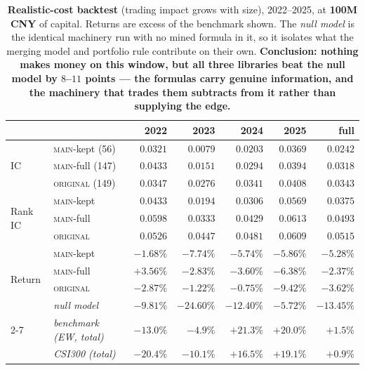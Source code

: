 \documentclass[11pt]{article}
\newcommand{\main}{\textsc{main}}
\newcommand{\orig}{\textsc{original}}
\begin{document}
\begin{table}[h]
\centering\small
\setlength{\tabcolsep}{5pt}
\begin{tabular}{llrrrrr}
\toprule
& & 2022 & 2023 & 2024 & 2025 & full \\
\midrule
\multirow{3}{*}{IC}
 & \main{}-kept (56)   & $0.0321$ & $0.0079$ & $0.0203$ & $0.0369$ & $0.0242$ \\
 & \main{}-full (147) & $\bm{0.0433}$ & $0.0151$ & $0.0294$ & $0.0394$ & $0.0318$ \\
 & \orig{} (149)      & $0.0347$ & $\bm{0.0276}$ & $\bm{0.0341}$ & $\bm{0.0408}$ & $\bm{0.0343}$ \\
\midrule
\multirow{3}{*}{Rank IC}
 & \main{}-kept   & $0.0433$ & $0.0194$ & $0.0306$ & $0.0569$ & $0.0375$ \\
 & \main{}-full  & $\bm{0.0598}$ & $0.0333$ & $0.0429$ & $\bm{0.0613}$ & $0.0493$ \\
 & \orig{}       & $0.0526$ & $\bm{0.0447}$ & $\bm{0.0481}$ & $0.0609$ & $\bm{0.0515}$ \\
\midrule
\multirow{4}{*}{Return}
 & \main{}-kept   & $-1.68\%$ & $-7.74\%$ & $-5.74\%$ & $-5.86\%$ & $-5.28\%$ \\
 & \main{}-full  & $\bm{+3.56\%}$ & $-2.83\%$ & $-3.60\%$ & $\bm{-6.38\%}$ & $\bm{-2.37\%}$ \\
 & \orig{}       & $-2.87\%$ & $\bm{-1.22\%}$ & $\bm{-0.75\%}$ & $-9.42\%$ & $-3.62\%$ \\
 & \emph{null model} & $-9.81\%$ & $-24.60\%$ & $-12.40\%$ & $-5.72\%$ & $-13.45\%$ \\
\cmidrule(l){2-7}
 & \emph{benchmark (EW, total)} & $-13.0\%$ & $-4.9\%$ & $+21.3\%$ & $+20.0\%$ & $+1.5\%$ \\
 & \emph{CSI300 (total)}        & $-20.4\%$ & $-10.1\%$ & $+16.5\%$ & $+19.1\%$ & $+0.9\%$ \\
\bottomrule
\end{tabular}
\caption{\textbf{Realistic-cost backtest} (trading impact grows with size),
2022--2025, at \textbf{100M CNY} of capital. Returns are excess of the benchmark
shown. The \emph{null model} is the identical machinery run with no mined formula in
it, so it isolates what the merging model and portfolio rule contribute on their own.
\textbf{Conclusion: nothing makes money on this window, but all three libraries beat
the null model by $8$--$11$ points --- the formulas carry genuine information, and the
machinery that trades them subtracts from it rather than supplying the edge.}}
\label{tab:fc-2225}
\end{table}
\end{document}
